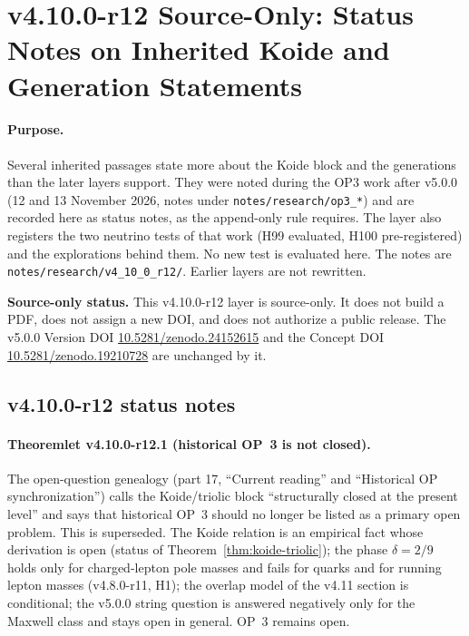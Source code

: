
\clearpage
\section*{v4.10.0-r12 Source-Only: Status Notes on Inherited Koide and Generation Statements}
\label{sec:v4100-r12-status-notes}

\paragraph{Purpose.}
Several inherited passages state more about the Koide block and the generations than the later layers support.  They were
noted during the OP3 work after v5.0.0 (12 and 13 November 2026, notes under \texttt{notes/\allowbreak research/\allowbreak op3\_*}) and
are recorded here as status notes, as the append-only rule requires.  The layer also registers the two neutrino tests of
that work (H99 evaluated, H100 pre-registered) and the explorations behind them.  No new test is evaluated here.  The notes
are \texttt{notes/\allowbreak research/\allowbreak v4\_10\_0\_r12/}.  Earlier layers are not rewritten.

\noindent\textbf{Source-only status.}
This v4.10.0-r12 layer is source-only.  It does not build a PDF, does not assign a new DOI,
and does not authorize a public release.  The v5.0.0 Version DOI
\href{https://doi.org/10.5281/zenodo.24152615}{10.5281/zenodo.24152615} and the Concept DOI
\href{https://doi.org/10.5281/zenodo.19210728}{10.5281/zenodo.19210728} are unchanged by it.

\subsection*{v4.10.0-r12 status notes}
\label{subsec:v4100-r12-status}

\paragraph{Theoremlet v4.10.0-r12.1 (historical OP~3 is not closed).}
The open-question genealogy (part 17, ``Current reading'' and ``Historical OP synchronization'') calls the Koide/triolic block
``structurally closed at the present level'' and says that historical OP~3 should no longer be listed as a primary open problem.
This is superseded.  The Koide relation is an empirical fact whose derivation is open (status of
Theorem~\ref{thm:koide-triolic}); the phase \(\delta=2/9\) holds only for charged-lepton pole masses and fails for quarks and
for running lepton masses (v4.8.0-r11, H1); the overlap model of the v4.11 section is conditional; the v5.0.0 string question
is answered negatively only for the Maxwell class and stays open in general.  OP~3 remains open.

